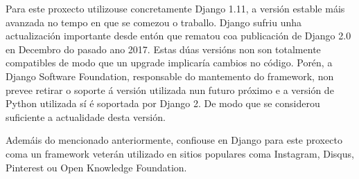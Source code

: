 Para este proxecto utilizouse concretamente Django 1.11, a versión estable máis avanzada no tempo en que se comezou o 
traballo. Django sufriu unha actualización importante desde entón que rematou coa publicación de Django 2.0 en Decembro do pasado ano 2017. Estas dúas versións non son totalmente compatibles de modo que un upgrade implicaría cambios no 
código. Porén, a Django Software Foundation, responsable do mantemento do framework, non prevee retirar o soporte á
versión utilizada nun futuro próximo e a versión de Python utilizada sí é soportada por Django 2\cite{django2}. De modo que 
se considerou suficiente a actualidade desta versión.    

Ademáis do mencionado anteriormente, confiouse en Django para este proxecto coma un framework veterán utilizado en sitios
populares coma Instagram, Disqus, Pinterest ou Open Knowledge Foundation.

